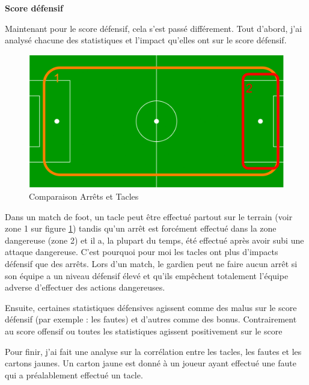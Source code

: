 \documentclass[a4paper,14pt]{extarticle}
\begin{document}
{\noindent\textbf{Score défensif}

Maintenant pour le score défensif, cela s'est passé différement. Tout d'abord, j'ai analysé chacune des statistiques et l'impact qu'elles ont sur le score défensif.

\begin{figure}[H]
    \centering
    \includegraphics[width=12cm]{../img/schemaPonderationDef.png}
    \caption{Comparaison Arrêts et Tacles}
    \label{fig:comparaisonArretsTacles}
\end{figure}

Dans un match de foot, un tacle peut être effectué partout sur le terrain (voir zone 1 sur figure \ref{fig:comparaisonArretsTacles}) tandis qu'un arrêt est forcément effectué dans la zone dangereuse (zone 2) et il a, la plupart du temps, été effectué après avoir subi une attaque dangereuse. C'est pourquoi pour moi les tacles ont plus d'impacts défensif que des arrêts. Lors d'un match, le gardien peut ne faire aucun arrêt si son équipe a un niveau défensif élevé et qu'ils empêchent totalement l'équipe adverse d'effectuer des actions dangereuses. 

Ensuite, certaines statistiques défensives agissent comme des malus sur le score défensif (par exemple : les fautes) et d'autres comme des bonus. Contrairement au score offensif ou toutes les statistiques agissent positivement sur le score

Pour finir, j'ai fait une analyse sur la corrélation entre les tacles, les fautes et les cartons jaunes. Un carton jaune est donné à un joueur ayant effectué une faute qui a préalablement effectué un tacle.

}
\end{document}
